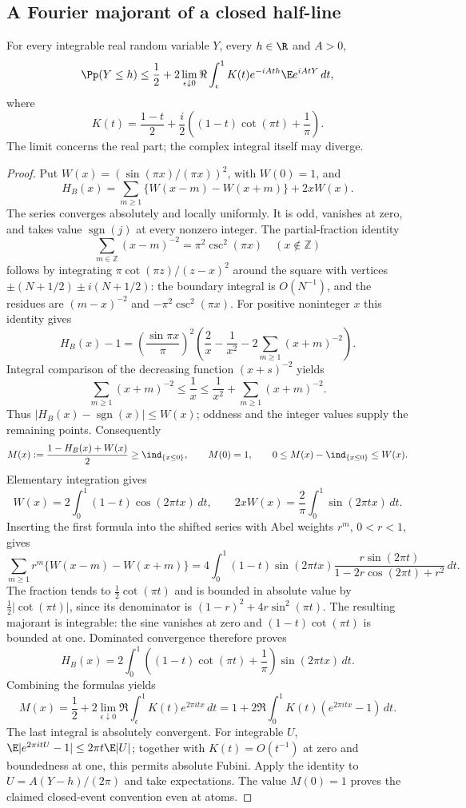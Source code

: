 \subsection{A Fourier majorant of a closed half-line}

\begin{lemma}\label{j:fourier:closed-majorant}
For every integrable real random variable $Y$, every $h\in\R$ and $A>0$,
\begin{equation}\label{j:fourier:closed-majorant-formula}
 \Pp(Y\le h)\le\frac12+
 2\lim_{\epsilon\downarrow0}\Re\int_\epsilon^1
 K(t)e^{-iAth}\E e^{iAtY}\,dt,
\end{equation}
where
\[
 K(t)=\frac{1-t}{2}+\frac i2
 \left((1-t)\cot(\pi t)+\frac1\pi\right).
\]
The limit concerns the real part; the complex integral itself may diverge.
\end{lemma}
\begin{proof}
Put $W(x)=(\sin(\pi x)/(\pi x))^2$, with $W(0)=1$, and
\[
 H_B(x)=\sum_{m\ge1}\{W(x-m)-W(x+m)\}+2xW(x).
\]
The series converges absolutely and locally uniformly. It is odd, vanishes
at zero, and takes value $\operatorname{sgn}(j)$ at every nonzero integer.
The partial-fraction identity
\[
 \sum_{m\in\mathbb Z}(x-m)^{-2}=\pi^2\csc^2(\pi x)
 \quad(x\notin\mathbb Z)
\]
follows by integrating $\pi\cot(\pi z)/(z-x)^2$ around the square
with vertices $\pm(N+1/2)\pm i(N+1/2)$: the boundary integral is
$O(N^{-1})$, and the residues are $(m-x)^{-2}$ and
$-\pi^2\csc^2(\pi x)$. For positive noninteger $x$ this identity gives
\[
 H_B(x)-1=\left(\frac{\sin\pi x}{\pi}\right)^2
 \left(\frac2x-\frac1{x^2}-2\sum_{m\ge1}(x+m)^{-2}\right).
\]
Integral comparison of the decreasing function $(x+s)^{-2}$ yields
\[
 \sum_{m\ge1}(x+m)^{-2}\le\frac1x
 \le\frac1{x^2}+\sum_{m\ge1}(x+m)^{-2}.
\]
Thus $|H_B(x)-\operatorname{sgn}(x)|\le W(x)$; oddness and the integer
values supply the remaining points. Consequently
\[
 M(x):=\frac{1-H_B(x)+W(x)}2\ge\ind_{\{x\le0\}},
 \qquad M(0)=1,\qquad 0\le M(x)-\ind_{\{x\le0\}}\le W(x).
\]
Elementary integration gives
\[
 W(x)=2\int_0^1(1-t)\cos(2\pi tx)\,dt,\qquad
 2xW(x)=\frac2\pi\int_0^1\sin(2\pi tx)\,dt.
\]
Inserting the first formula into the shifted series with Abel weights
$r^m$, $0<r<1$, gives
\[
 \sum_{m\ge1}r^m\{W(x-m)-W(x+m)\}
 =4\int_0^1(1-t)\sin(2\pi tx)
 \frac{r\sin(2\pi t)}{1-2r\cos(2\pi t)+r^2}\,dt.
\]
The fraction tends to $\tfrac12\cot(\pi t)$ and is bounded in absolute
value by $\tfrac12|\cot(\pi t)|$, since its denominator is
$(1-r)^2+4r\sin^2(\pi t)$. The resulting majorant is integrable:
the sine vanishes at zero and $(1-t)\cot(\pi t)$ is bounded at one.
Dominated convergence therefore proves
\[
 H_B(x)=2\int_0^1
 \left((1-t)\cot(\pi t)+\frac1\pi\right)\sin(2\pi tx)\,dt.
\]
Combining the formulas yields
\[
 M(x)=\frac12+2\lim_{\epsilon\downarrow0}\Re\int_\epsilon^1
 K(t)e^{2\pi itx}\,dt
 =1+2\Re\int_0^1K(t)(e^{2\pi itx}-1)\,dt.
\]
The last integral is absolutely convergent. For integrable $U$,
$\E|e^{2\pi itU}-1|\le2\pi t\E|U|$; together with $K(t)=O(t^{-1})$
at zero and boundedness at one, this permits absolute Fubini.
Apply the identity to $U=A(Y-h)/(2\pi)$ and take expectations.
The value $M(0)=1$ proves the claimed closed-event convention even at atoms.
\end{proof}

